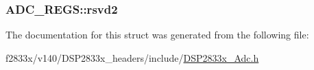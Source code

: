 \subsubsection[{rsvd2}]{ A\+D\+C\+\_\+\+R\+E\+G\+S\+::rsvd2}\label{struct_a_d_c___r_e_g_s_a395e4e2cbaaa2130c3e34d2fb71f13e0}


The documentation for this struct was generated from the following file\+:\begin{DoxyCompactItemize}
\item 
f2833x/v140/\+D\+S\+P2833x\+\_\+headers/include/\hyperlink{_d_s_p2833x___adc_8h}{D\+S\+P2833x\+\_\+\+Adc.\+h}\end{DoxyCompactItemize}

